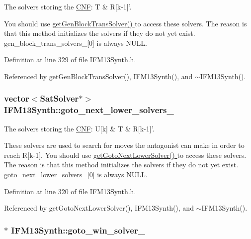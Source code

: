 The solvers storing the \hyperlink{classCNF}{C\-N\-F}\-: T \& R\mbox{[}k-\/1\mbox{]}'. 

You should use \hyperlink{classIFM13Synth_af087a4ddf9026bb48a752c03e539d9da}{get\-Gen\-Block\-Trans\-Solver() } to access these solvers. The reason is that this method initializes the solvers if they do not yet exist. gen\-\_\-block\-\_\-trans\-\_\-solvers\-\_\-\mbox{[}0\mbox{]} is always N\-U\-L\-L. 

Definition at line 329 of file I\-F\-M13\-Synth.\-h.



Referenced by get\-Gen\-Block\-Trans\-Solver(), I\-F\-M13\-Synth(), and $\sim$\-I\-F\-M13\-Synth().

\hypertarget{classIFM13Synth_a4b964deefde7cd2cc4d81c8ea6f66976}{
\subsubsection[{goto\-\_\-next\-\_\-lower\-\_\-solvers\-\_\-}]{\setlength{\rightskip}{0pt plus 5cm}vector$<${\bf Sat\-Solver}$\ast$$>$ I\-F\-M13\-Synth\-::goto\-\_\-next\-\_\-lower\-\_\-solvers\-\_\-\hspace{0.3cm}{\ttfamily [protected]}}}\label{classIFM13Synth_a4b964deefde7cd2cc4d81c8ea6f66976}


The solvers storing the \hyperlink{classCNF}{C\-N\-F}\-: U\mbox{[}k\mbox{]} \& T \& R\mbox{[}k-\/1\mbox{]}'. 

These solvers are used to search for moves the antagonist can make in order to reach R\mbox{[}k-\/1\mbox{]}. You should use \hyperlink{classIFM13Synth_ae97c0b41568cf25e163ab9b309f0dcaa}{get\-Goto\-Next\-Lower\-Solver() } to access these solvers. The reason is that this method initializes the solvers if they do not yet exist. goto\-\_\-next\-\_\-lower\-\_\-solvers\-\_\-\mbox{[}0\mbox{]} is always N\-U\-L\-L. 

Definition at line 320 of file I\-F\-M13\-Synth.\-h.



Referenced by get\-Goto\-Next\-Lower\-Solver(), I\-F\-M13\-Synth(), and $\sim$\-I\-F\-M13\-Synth().

\hypertarget{classIFM13Synth_a08f52e41085966317cfc516bd52dc3b3}{
\subsubsection[{goto\-\_\-win\-\_\-solver\-\_\-}]{$\ast$ I\-F\-M13\-Synth\-::goto\-\_\-win\-\_\-solver\-\_\-\hspace{0.3cm}{\ttfamily [protected]}}}\label{classIFM13Synth_a08f52e41085966317cfc516bd52dc3b3}


